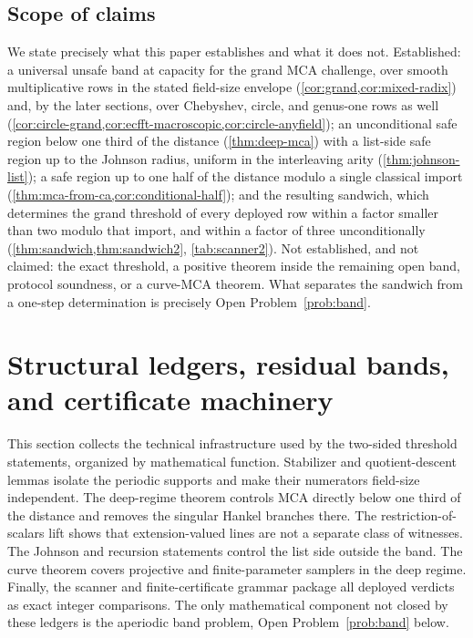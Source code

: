 \documentclass[11pt]{article}
\theoremstyle{definition}
\theoremstyle{remark}
\begin{document}
\subsection{Scope of claims}

We state precisely what this paper establishes and what it does not. Established: a universal unsafe band at capacity for the grand MCA challenge, over smooth multiplicative rows in the stated field-size envelope (\cref{cor:grand,cor:mixed-radix}) and, by the later sections, over Chebyshev, circle, and genus-one rows as well (\cref{cor:circle-grand,cor:ecfft-macroscopic,cor:circle-anyfield}); an unconditional safe region below one third of the distance (\cref{thm:deep-mca}) with a list-side safe region up to the Johnson radius, uniform in the interleaving arity (\cref{thm:johnson-list}); a safe region up to one half of the distance modulo a single classical import (\cref{thm:mca-from-ca,cor:conditional-half}); and the resulting sandwich, which determines the grand threshold of every deployed row within a factor smaller than two modulo that import, and within a factor of three unconditionally (\cref{thm:sandwich,thm:sandwich2}, \cref{tab:scanner2}). Not established, and not claimed: the exact threshold, a positive theorem inside the remaining open band, protocol soundness, or a curve-MCA theorem. What separates the sandwich from a one-step determination is precisely Open Problem~\ref{prob:band}.

\section{Structural ledgers, residual bands, and certificate machinery}\label{sec:discharge}

This section collects the technical infrastructure used by the two-sided threshold statements, organized by mathematical function.  Stabilizer and quotient-descent lemmas isolate the periodic supports and make their numerators field-size independent.  The deep-regime theorem controls MCA directly below one third of the distance and removes the singular Hankel branches there.  The restriction-of-scalars lift shows that extension-valued lines are not a separate class of witnesses.  The Johnson and recursion statements control the list side outside the band.  The curve theorem covers projective and finite-parameter samplers in the deep regime.  Finally, the scanner and finite-certificate grammar package all deployed verdicts as exact integer comparisons.  The only mathematical component not closed by these ledgers is the aperiodic band problem, Open Problem~\ref{prob:band} below.
\end{document}

